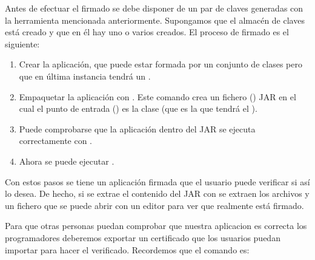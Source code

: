 \documentclass[letterpaper,10pt,spanish]{sphinxmanual}
\begin{document}
Antes de efectuar el firmado se debe disponer de un par de claves generadas con la herramienta  mencionada anteriormente. Supongamos que el almacén de claves está creado y que en él hay uno o varios  creados. El proceso de firmado es el siguiente:
\begin{enumerate}
%
\item {} 
Crear la aplicación, que puede estar formada por un conjunto de clases pero que en última instancia tendrá un .

\item {} 
Empaquetar la aplicación con . Este comando crea un fichero () JAR en el cual el punto de entrada () es la clase  (que es la que tendrá el ).

\item {} 
Puede comprobarse que la aplicación dentro del JAR se ejecuta correctamente con .

\item {} 
Ahora se puede ejecutar .

\end{enumerate}

Con estos pasos se tiene un aplicación firmada que el usuario puede verificar si así lo desea. De hecho, si se extrae el contenido del JAR con  se extraen los archivos  y un fichero  que se puede abrir con un editor para ver que realmente está firmado.

Para que otras personas puedan comprobar que nuestra aplicacion es correcta los programadores deberemos exportar un certificado que los usuarios puedan importar para hacer el verificado. Recordemos que el comando es:

\begin{sphinxVerbatim}[commandchars=\\\{\}]
   \PYGZbs{}    
\end{sphinxVerbatim}
\end{document}
